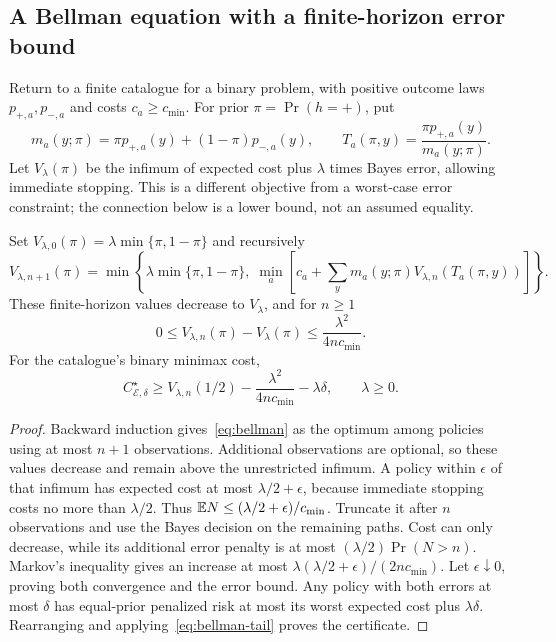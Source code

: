 \subsection{A Bellman equation with a finite-horizon error bound}
Return to a finite catalogue for a binary problem, with positive outcome
laws $p_{+,a},p_{-,a}$ and costs $c_a\geq c_{\min}$.
For prior $\pi=\Pr(h=+)$, put
\[
 m_a(y;\pi)=\pi p_{+,a}(y)+(1-\pi)p_{-,a}(y),\qquad
 T_a(\pi,y)=\frac{\pi p_{+,a}(y)}{m_a(y;\pi)}.
\]
Let $V_\lambda(\pi)$ be the infimum of expected cost plus $\lambda$
times Bayes error, allowing immediate stopping. This is a different
objective from a worst-case error constraint; the connection below is
a lower bound, not an assumed equality.

\begin{theorem}
\label{thm:bellman-certificate}
Set $V_{\lambda,0}(\pi)=\lambda\min\{\pi,1-\pi\}$ and recursively
\begin{equation}\label{eq:bellman}
 V_{\lambda,n+1}(\pi)=\min\left\{
 \lambda\min\{\pi,1-\pi\},\;
 \min_a\left[c_a+\sum_y m_a(y;\pi)
                  V_{\lambda,n}(T_a(\pi,y))\right]\right\}.
\end{equation}
These finite-horizon values decrease to $V_\lambda$, and for $n\geq1$
\begin{equation}\label{eq:bellman-tail}
 0\leq V_{\lambda,n}(\pi)-V_\lambda(\pi)
 \leq\frac{\lambda^2}{4nc_{\min}}.
\end{equation}
For the catalogue's binary minimax cost,
\begin{equation}\label{eq:bellman-minimax}
 C_{\mathcal E,\delta}^\star\geq
 V_{\lambda,n}(1/2)-\frac{\lambda^2}{4nc_{\min}}-\lambda\delta,
 \qquad\lambda\geq0.
\end{equation}
\end{theorem}
\begin{proof}
Backward induction gives~\eqref{eq:bellman} as the optimum among
policies using at most $n+1$ observations. Additional observations are
optional, so these values decrease and remain above the unrestricted
infimum. A policy within $\epsilon$ of that infimum has expected cost
at most $\lambda/2+\epsilon$, because immediate stopping costs no more
than $\lambda/2$. Thus $\mathbb E N\leq(\lambda/2+\epsilon)/c_{\min}$.
Truncate it after $n$ observations and use the Bayes decision on the
remaining paths. Cost can only decrease, while its additional error
penalty is at most $(\lambda/2)\Pr(N>n)$.
Markov's inequality gives an increase at most
$\lambda(\lambda/2+\epsilon)/(2nc_{\min})$.
Let $\epsilon\downarrow0$, proving both convergence and the error bound.
Any policy with both errors at most $\delta$ has equal-prior penalized
risk at most its worst expected cost plus $\lambda\delta$.
Rearranging and applying~\eqref{eq:bellman-tail} proves the certificate.
\end{proof}

